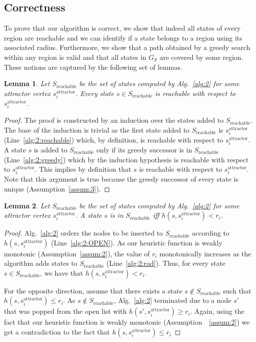 \documentclass[letterpaper]{article} %
\newcommand{\calS}{\ensuremath{\mathcal{S}}\xspace}
\newcommand{\sAttract}{\ensuremath{s^{\text{attractor}}_i}\xspace}
\newtheorem{lemma}{Lemma}
\begin{document}
\subsection{Correctness}
\label{subsec:correct}
To prove that our algorithm is correct, we show that indeed all states of every region are reachable and we can identify if a state belongs to a region using its associated radius.
Furthermore, we show that a path obtained by a greedy search within any region is valid and that all states in $G_\calS$ are covered by some region.
These notions are captured by the following set of lemmas.

\vspace{2mm}
\begin{lemma}
\label{lemma:reachable-1}
Let $S_{\text{reachable}}$ be the set of states computed by Alg.~\ref{alg:2} for some attractor vertex \sAttract.
%
Every state $s \in S_{\text{reachable}}$ is reachable with respect to \sAttract.
\end{lemma}
%
\begin{proof}
The proof is constructed by an induction over the states added to $S_{\text{reachable}}$.
The base of the induction is trivial as the first state added to $S_{\text{reachable}}$  is \sAttract (Line~\ref{alg:2:reachable}) which, by definition, is reachable with respect to \sAttract.
%
A state $s$ is added to $S_{\text{reachable}}$ only if its greedy successor is in $S_{\text{reachable}}$ (Line~\ref{alg:2:greedy}) which by the induction hypothesis is reachable with respect to \sAttract.
This implies by definition that $s$ is reachable with respect to \sAttract.
%
Note that this argument is true because the greedy successor of every state is unique (Assumption~\ref{assum:3}).
\end{proof}

\begin{lemma}
\label{lemma:reachable-2}
Let $S_{\text{reachable}}$ be the set of states computed by Alg.~\ref{alg:2} for some attractor vertex \sAttract.
%
A state $s$ is in $S_{\text{reachable}}$ iff $h(s, \sAttract) < r_i$.
\end{lemma}

\begin{proof}
Alg.~\ref{alg:2} orders the nodes to be inserted to $S_{\text{reachable}}$ according to $h(s, \sAttract)$ (Line~\ref{alg:2:OPEN}).
As our heuristic function is weakly monotonic (Assumption~\ref{assum:2}), the value of $r_i$ monotonically increases as the algorithm adds states to $S_{\text{reachable}}$ (Line~\ref{alg:2:rad}).
Thus, for every state $s \in S_{\text{reachable}}$, we have that $h(s, \sAttract) < r_i$.

For the opposite direction, assume that there exists a state $s \notin S_{\text{reachable}}$ such that $h(s, \sAttract) \leq r_i$.
As $s\notin S_{\text{reachable}}$, Alg.~\ref{alg:2} terminated due to a node $s'$ that was popped from the open list with 
$h(s', \sAttract) \geq r_i$.
Again, using the fact that our heuristic function is weakly monotonic (Assumption~~\ref{assum:2}) we get a contradiction to the fact that $h(s, \sAttract) \leq r_i$
\end{proof}
\end{document}
